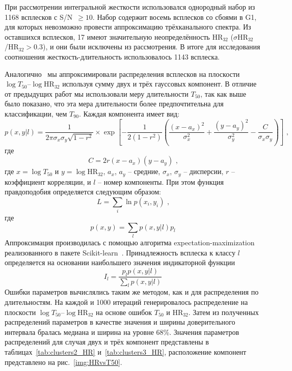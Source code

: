 При рассмотрении интегральной жесткости использовался однородный набор из 1168 всплесков с S/N~$\geq 10$. Набор содержит восемь всплесков со сбоями в G1, для которых невозможно провести аппроксимацию трёхканального спектра. Из оставшихся всплесков, 17 имеют значительную неопределённость HR$_{32}$ ($\sigma$HR$_{32}$/HR$_{32} >0.3$), и они были исключены из рассмотрения. В итоге для исследования соотношения жесткость-длительность использовалось 1143 всплеска.

Аналогично~\citep{Horvath_2006} мы аппроксимировали распределения всплесков на плоскости $\log T_{50}$--$\log \mbox{HR}_{32}$ используя сумму двух и трёх гауссовых компонент. В отличие от предыдущих работ мы использовали меру длительности $T_{50}$, так как выше было показано, что эта мера длительности более предпочтительна для классификации, чем $T_{90}$. Каждая компонента имеет вид: 
\begin{equation}
p(x,y| l) = \frac{1}{2\pi \sigma_x \sigma_y \sqrt{1-r^2}}\times \exp\left[ -\frac{1}{2(1-r^2)}\left( \frac{(x-a_x)^2}{\sigma_x^2} + \frac{(y-a_y)^2}{\sigma_y^2} -\frac{C}{\sigma_x \sigma_y}\right)\right]\mbox{ ,}
\end{equation}
где
\begin{equation}
C = 2r(x-a_x)(y-a_y)\mbox{ ,} \nonumber
\end{equation}
где $x=\log T_{50}$ и $y=\log \mbox{HR}_{32}$,  $a_x$, $a_y$ -- средние, $\sigma_x$, $\sigma_y$ -- дисперсии, $r$ -- коэффициент корреляции, и $l$ -- номер компоненты. При этом функция правдоподобия определяется следующим образом:
\begin{equation}
L = \sum_i \ln p(x_i, y_i)\mbox{ ,}
\end{equation}
где
\begin{equation}
p(x,y) = \sum_l  p(x, y|l)p_l \nonumber
\end{equation}
Аппроксимация производилась с помощью алгоритма expectation-maximization~\citep{Horvath_2006, Balazs_2003} реализованного в пакете Scikit-learn~\citep{scikit-learn}.  Принадлежность всплеска к классу $l$ определяется на основании наибольшего значения индикаторной функции
\begin{equation}
I_l =\frac{p_l p(x,y|l)}{\sum_l  p(x, y|l)}
\end{equation}
Ошибки параметров вычислялись таким же методом, как и для распределения по длительностям. На каждой и 1000 итераций генерировалось распределение на плоскости  $\log T_{50}$--$\log\mbox{HR}_{32}$ на основе ошибок $T_{50}$ и HR$_{32}$. Затем из полученных распределений параметров в качестве значения и ширины доверительного интервала бралась медиана и ширина на уровне 68\%. Значения параметров распределений для случая двух и трёх компонент представлены в таблицах~\ref{tab:clusters2_HR} и~\ref{tab:clusters3_HR}, расположение компонент представлено на рис.~\ref{img:HRvsT50}. 

